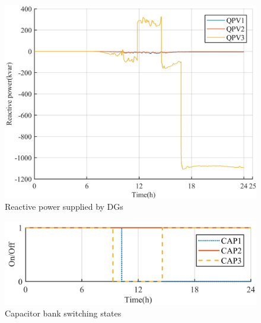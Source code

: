 \begin{figure}[!htb]
\centering
\includegraphics[width=\linewidth]{figs/NEW_PQ.png}
\caption{Reactive power supplied by DGs}
\label{fig:DG_Q}
\end{figure}

\begin{figure}[!htb]
\centering
\includegraphics[width=\linewidth]{figs/NEW_CAPS.png}
\caption{Capacitor bank switching states}
\label{fig:cap_bank}
\end{figure}